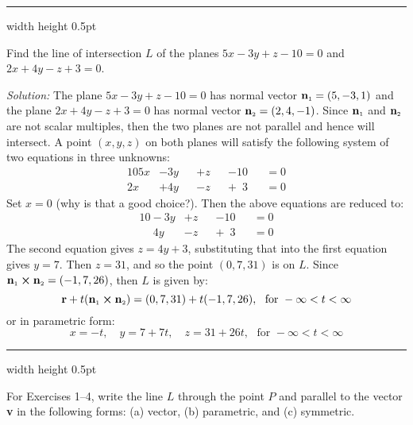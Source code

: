 \vspace{4mm}
\hrule width \textwidth height 0.5pt
\begin{exmp}\label{exmp:planeinter}
 Find the line of intersection $L$ of the planes $5x - 3y + z - 10 = 0$ and $2x + 4y - z + 3 = 0$.\vspace{1mm}
 \par\noindent\emph{Solution:} The plane $5x - 3y + z - 10 = 0$ has normal vector $\textbf{n}_{\scriptscriptstyle 1} = (5,-3,1)$ and
 the plane $2x + 4y - z + 3 = 0$ has normal vector $\textbf{n}_{\scriptscriptstyle 2} = (2,4,-1)$. Since $\textbf{n}_{\scriptscriptstyle 1}$ and
 $\textbf{n}_{\scriptscriptstyle 2}$ are not scalar multiples, then the two planes are not parallel and hence will intersect. A
 point $(x,y,z)$ on both planes will satisfy the following system of two equations in three unknowns:
 \begin{alignat*}{10}
  5x &- 3y &&+ z &&- 10 &&= 0\\
  2x &+ 4y &&- z &&+ \phantom{1}3 &&= 0
 \end{alignat*}
 Set $x = 0$ (why is that a good choice?). Then the above equations are reduced to:
 \begin{alignat*}{10}
  -3y &+ z &&- 10 &&= 0\\
  \phantom{-}4y &- z &&+ \phantom{1}3 &&= 0
 \end{alignat*}
 The second equation gives $z = 4y + 3$, substituting that into the first equation gives $y = 7$. Then $z = 31$,
 and so the point $(0,7,31)$ is on $L$. Since $\textbf{n}_{\scriptscriptstyle 1} \bm{\times} \textbf{n}_{\scriptscriptstyle 2} = (-1,7,26)$,
 then $L$ is given by:
 \begin{displaymath}
  \textbf{r} + t(\textbf{n}_{\scriptscriptstyle 1} \bm{\times} \textbf{n}_{\scriptscriptstyle 2}) = (0,7,31) + t(-1,7,26), \text{~~for~}
  -\infty < t < \infty
 \end{displaymath}
 or in parametric form:
 \begin{displaymath}
  x = -t, \quad y = 7 + 7t, \quad z = 31 +26t, \text{~~for~} -\infty < t < \infty
 \end{displaymath} 
\end{exmp}
\hrule width \textwidth height 0.5pt
\newpage
\centerline{}\label{sec1dot5}
\par\noindent For Exercises 1--4, write the line $L$ through the point $P$ and parallel to the vector \textbf{v} in the
 following forms: (a) vector, (b) parametric, and (c) symmetric.
